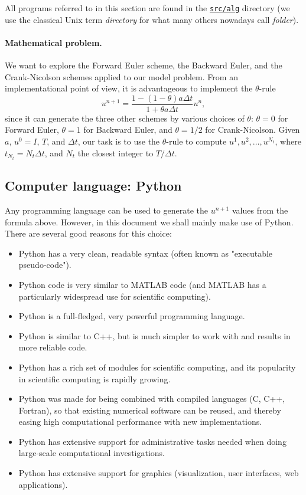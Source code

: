 \documentclass[%
oneside,                 %
final,                   %
10pt]{article}
\begin{document}
All programs referred to in this section are found in the
\href{{http://tinyurl.com/ofkw6kc/alg}}{\nolinkurl{src/alg}} directory (we use the classical
Unix term \emph{directory} for what many others nowadays call \emph{folder}).

\paragraph{Mathematical problem.}
We want to explore the Forward Euler scheme, the
Backward Euler, and the Crank-Nicolson schemes applied to our model problem.
From an implementational point of view, it is advantageous to
implement the $\theta$-rule
\[
u^{n+1} = \frac{1 - (1-\theta) a\Delta t}{1 + \theta a\Delta t}u^n,
\]
since it can generate the three other schemes by various
choices of $\theta$: $\theta=0$ for Forward Euler, $\theta =1$ for
Backward Euler, and $\theta =1/2$ for Crank-Nicolson.
Given $a$, $u^0=I$, $T$, and $\Delta t$,
our task is to use the $\theta$-rule to
compute $u^1, u^2,\ldots,u^{N_t}$, where $t_{N_t}=N_t\Delta t$, and
$N_t$ the closest integer to $T/\Delta t$.

\subsection{Computer language: Python}

Any programming language can be used to generate the $u^{n+1}$ values from
the formula above. However, in this document we shall mainly make use of
Python. There are several good reasons for this choice:

\begin{itemize}
  \item Python has a very clean, readable syntax (often known as
    "executable pseudo-code").

  \item Python code is very similar to MATLAB code (and MATLAB has a
    particularly widespread use for scientific computing).

  \item Python is a full-fledged, very powerful programming language.

  \item Python is similar to C++, but is much simpler to work with and
    results in more reliable code.

  \item Python has a rich set of modules for scientific computing, and its
    popularity in scientific computing is rapidly growing.

  \item Python was made for being combined with compiled languages
    (C, C++, Fortran), so that existing numerical software can be reused,
    and thereby easing high computational performance with new implementations.

  \item Python has extensive support for administrative tasks
    needed when doing large-scale computational investigations.

  \item Python has extensive support for graphics (visualization,
    user interfaces, web applications).
\end{itemize}
\end{document}
